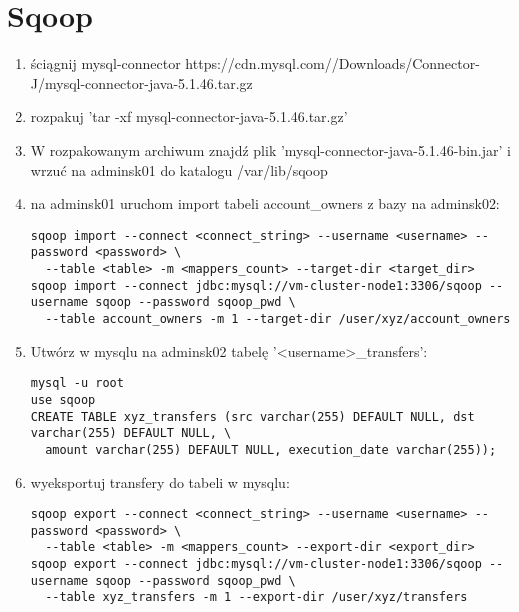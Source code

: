 \documentclass{article}
\begin{document}
\section*{Sqoop}

\begin{enumerate}
\item ściągnij mysql-connector https://cdn.mysql.com//Downloads/Connector-J/mysql-connector-java-5.1.46.tar.gz
\item rozpakuj 'tar -xf mysql-connector-java-5.1.46.tar.gz'
\item W rozpakowanym archiwum znajdź plik 'mysql-connector-java-5.1.46-bin.jar' i wrzuć na adminsk01 do katalogu /var/lib/sqoop
\item na adminsk01 uruchom import tabeli account\_owners z bazy na adminsk02:
\begin{lstlisting}
sqoop import --connect <connect_string> --username <username> --password <password> \
  --table <table> -m <mappers_count> --target-dir <target_dir>
sqoop import --connect jdbc:mysql://vm-cluster-node1:3306/sqoop --username sqoop --password sqoop_pwd \
  --table account_owners -m 1 --target-dir /user/xyz/account_owners
\end{lstlisting}
\item Utwórz w mysqlu na adminsk02 tabelę '<username>\_transfers':
\begin{lstlisting}
mysql -u root
use sqoop
CREATE TABLE xyz_transfers (src varchar(255) DEFAULT NULL, dst varchar(255) DEFAULT NULL, \
  amount varchar(255) DEFAULT NULL, execution_date varchar(255));
\end{lstlisting}
\item wyeksportuj transfery do tabeli w mysqlu:
\begin{lstlisting}
sqoop export --connect <connect_string> --username <username> --password <password> \
  --table <table> -m <mappers_count> --export-dir <export_dir>
sqoop export --connect jdbc:mysql://vm-cluster-node1:3306/sqoop --username sqoop --password sqoop_pwd \
  --table xyz_transfers -m 1 --export-dir /user/xyz/transfers
\end{lstlisting}
\end{enumerate}
\end{document}
